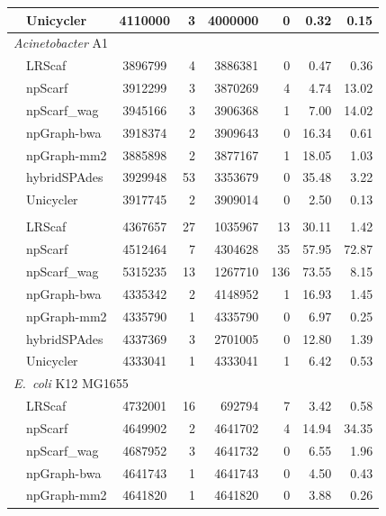 \documentclass[10pt,letterpaper]{article}
\newcommand{\ec}{\emph{E.~coli}}
\begin{document}
\begin{longtable}[!hpt]{llcrrrrr}
\rowcolor{Gray}
& Unicycler & 4110000  &  3  &  4000000  &  0  &  0.32  & 0.15  \\
\hline
\multicolumn{8}{l}{\emph{Acinetobacter} A1} \\* %
\nobreakmidrule
& LRScaf & 3896799 & 4 & 3886381 & 0 & 0.47 & 0.36\\*
& npScarf & 3912299  &  3  &  3870269  &  4  & 4.74  & 13.02 \\*
& npScarf\_wag & 3945166  &  3  &  3906368  &  1  & 7.00  & 14.02 \\*
& npGraph-bwa & 3918374  &  2  &  3909643  &  0 & 16.34  & 0.61 \\*
& npGraph-mm2 & 3885898  &  2  &  3877167  & 1 & 18.05  & 1.03 \\*
& hybridSPAdes &  3929948 &  53  &  3353679  &  0  & 35.48  & 3.22\\*
& Unicycler & 3917745  &  2 & 3909014  & 0  & 2.50  &  0.13\\
\hline
\rowcolor{Gray}
\multicolumn{8}{l}{\emph{Acinetobacter} AB30} \\* %
\nobreakmidrule
\rowcolor{Gray}
& LRScaf & 4367657 & 27 & 1035967 & 13 & 30.11 & 1.42\\* 
\rowcolor{Gray}
& npScarf & 4512464  &  7  &  4304628  &  35  & 57.95  & 72.87\\*
\rowcolor{Gray}
& npScarf\_wag & 5315235  &  13  &  1267710  &  136  &  73.55 & 8.15\\*
\rowcolor{Gray}
& npGraph-bwa & 4335342  &  2  &  4148952  &  1  & 16.93  & 1.45\\*
\rowcolor{Gray}
& npGraph-mm2 & 4335790  &  1  &  4335790  & 0   &  6.97 & 0.25\\*
\rowcolor{Gray}
& hybridSPAdes & 4337369  &  3  &  2701005  &  0  &  12.80 &  1.39\\*
\rowcolor{Gray}
& Unicycler &  4333041 &  1  &  4333041  &  1  &  6.42 &  0.53\\
\hline
\multicolumn{8}{l}{\ec{} K12 MG1655} \\* %
\nobreakmidrule
& LRScaf & 4732001 & 16 & 692794 & 7 & 3.42 & 0.58\\*
& npScarf & 4649902  &  2  &  4641702  &  4  & 14.94  & 34.35 \\*
& npScarf\_wag &  4687952 &  3  &  4641732  &  0  & 6.55  &  1.96\\*
& npGraph-bwa & 4641743  &  1  &  4641743  & 0  &  4.50 & 0.43 \\*
& npGraph-mm2 & 4641820  &  1  &  4641820  &  0 &  3.88 & 0.26 \\*

\end{longtable}
\end{document}
